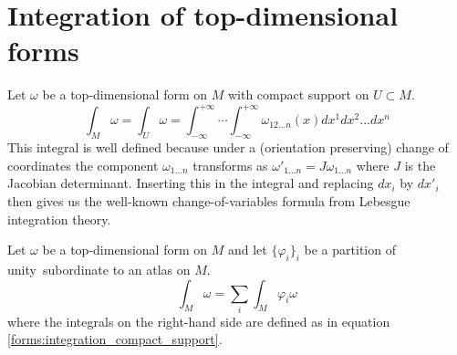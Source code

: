 \section{Integration of top-dimensional forms}

	

	\begin{formula}
		Let $\omega$ be a top-dimensional form on $M$ with compact support on $U\subset M$.
		\begin{equation}
			\label{forms:integration_compact_support}
			\int_M\omega = \int_U\omega = \int_{-\infty}^{+\infty}\cdots\int_{-\infty}^{+\infty}\omega_{12...n}(x)dx^1dx^2...dx^n
		\end{equation}
		This integral is well defined because under a (orientation preserving) change of coordinates the component $\omega_{1...n}$ transforms as $\omega'_{1...n} = J\omega_{1...n}$ where $J$ is the Jacobian determinant. Inserting this in the integral and replacing $dx_i$ by $dx'_i$ then gives us the well-known change-of-variables formula from Lebesgue integration theory.
	\end{formula}

	\begin{formula}[General]
		Let $\omega$ be a top-dimensional form on $M$ and let $\{\varphi_i\}_i$ be a partition of unity\footnotemark\ subordinate to an atlas on $M$.
		\begin{equation}
			\label{forms:integration}
			\int_M\omega = \sum_i\int_M\varphi_i\omega
		\end{equation}
		where the integrals on the right-hand side are defined as in equation \ref{forms:integration_compact_support}.
	\end{formula}
	
	
